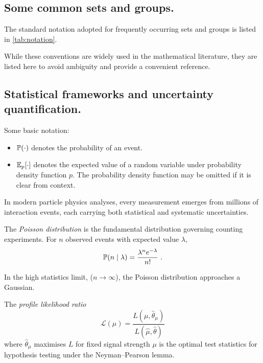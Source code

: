     \subsection{Some common sets and groups.}
    The standard notation adopted for frequently occurring sets and groups is listed in \cref{tab:notation}.
    
    While these conventions are widely used in the mathematical literature, they are listed here to avoid ambiguity and provide a convenient reference.
    
    \subsection{Statistical frameworks and uncertainty quantification.}

        \begin{note*} Some basic notation:
            \begin{itemize}
                \item \(\P(\cdot)\) denotes the probability of an event.
                \item \(\E_{p}[\cdot]\) denotes the expected value of a random variable under probability density function \(p.\) The probability density function may be omitted if it is clear from context.
            \end{itemize}
        \end{note*}
        
        In modern particle physics analyses, every measurement emerges from millions of interaction events, each carrying both statistical and systematic uncertainties.
        \begin{definition}
            The \emph{Poisson distribution} is the fundamental distribution governing counting experiments.
            For \(n\) observed events with expected value \(\lambda\),
            \[
                \P(n\mid\lambda) = \frac{\lambda^n e^{-\lambda}}{n!}\;.
            \]
        \end{definition}

    In the high statistics limit, (\(n \to\infty\)), the Poisson distribution approaches a Gaussian.
    
    \begin{definition}
        The \emph{profile likelihood ratio}
            \[
                \mathcal L(\mu) = \frac{L(\mu, \hat\theta_\mu)}{ L(\hat\mu, \hat\theta)}
            \]
            where \(\hat\theta_\mu\) maximises \(L\) for fixed signal strength \(\mu\) is the optimal test statistics for hypothesis testing under the Neyman--Pearson lemma.
    \end{definition}
